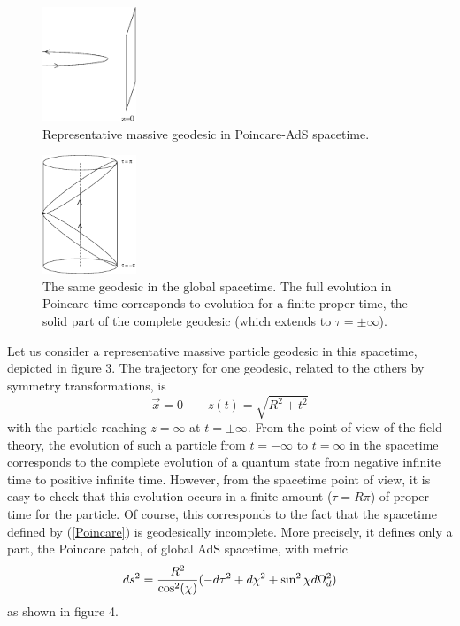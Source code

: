 \documentclass[12pt,epsf]{article}
\newcommand{\be}{\begin{equation}}
\newcommand{\ee}{\end{equation}}
\renewcommand{\(}{\left(}
\renewcommand{\)}{\right)}
\begin{document}
\begin{figure}
\centering
\includegraphics[width=0.25\textwidth]{bounce.eps}
\caption{Representative massive geodesic in Poincare-AdS spacetime.}
\end{figure}

\begin{figure}
\centering
\includegraphics[width=0.25\textwidth]{global.eps}
\caption{The same geodesic in the global spacetime. The full evolution in Poincare time corresponds to evolution for a finite proper time, the solid part of the complete geodesic (which extends to $\tau = \pm \infty$).}
\end{figure}

Let us consider a representative massive particle geodesic in this spacetime, depicted in figure 3. The trajectory for one geodesic, related to the others by symmetry transformations, is
\be
\label{incomplete}
\vec{x} = 0 \qquad z(t) = \sqrt{R^2 + t^2}
\ee
with the particle reaching $z=\infty$ at $t = \pm \infty$. From the point of view of the field theory, the evolution of such a particle from $t=-\infty$ to $t=\infty$ in the spacetime corresponds to the complete evolution of a quantum state from negative infinite time to positive infinite time. However, from the spacetime point of view, it is easy to check that this evolution occurs in a finite amount ($\tau=R \pi$) of proper time for the particle. Of course, this corresponds to the fact that the spacetime defined by (\ref{Poincare}) is geodesically incomplete. More precisely, it defines only a part, the Poincare patch, of global AdS spacetime, with metric
\be
\label{global}
ds^2 = {R^2 \over \cos^2(\chi)} (- d \tau^2 + d \chi^2 + \sin^2 \chi d \Omega_{d}^2)
\ee
as shown in figure 4.
\end{document}

